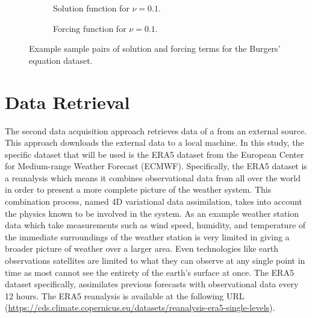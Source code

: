 \begin{figure}[H]
  \begin{subfigure}{0.49\linewidth}
    \begin{adjustbox}{width=\linewidth}
      
    \end{adjustbox}
    \caption{Solution function for \(\nu=0.1\).}\label{fig:burgers_solution_0.1}
  \end{subfigure}
  \begin{subfigure}{0.49\linewidth}
    \begin{adjustbox}{width=\linewidth}
      
    \end{adjustbox}
    \caption{Forcing function for \(\nu=0.1\).}\label{fig:burgers_forcing_0.1}
  \end{subfigure}
  \caption{Example sample pairs of solution and forcing terms for the Burgers' equation dataset.}\label{fig:burgers_data}
\end{figure}

\section{Data Retrieval}\label{sec:data_retrieval}
\noindent The second data acquisition approach retrieves data of a from an external source. This approach downloads the external data to a local machine. In this study, the specific dataset that will be used is the ERA5 dataset from the European Center for Medium-range Weather Forecast (ECMWF). Specifically, the ERA5 dataset is a reanalysis which means it combines observational data from all over the world in order to present a more complete picture of the weather system. This combination process, named 4D variational data assimilation, takes into account the physics known to be involved in the system. As an example weather station data which take measurements such as wind speed, humidity, and temperature of the immediate surroundings of the weather station is very limited in giving a broader picture of weather over a larger area. Even technologies like earth observations satellites are limited to what they can observe at any single point in time as most cannot see the entirety of the earth's surface at once. The ERA5 dataset specifically, assimilates previous forecasts with observational data every 12 hours. The ERA5 reanalysis is available at the following URL (\url{https://cds.climate.copernicus.eu/datasets/reanalysis-era5-single-levels}).

